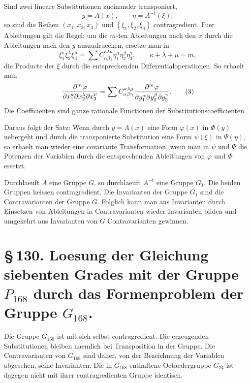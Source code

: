 \documentclass[11pt]{article}
\begin{document}
Sind zwei lineare Substitutionen zueinander transponiert,
\begin{equation}
y=A(x),\qquad \eta=A^{-t}(\xi),
\tag{1}
\end{equation}
so sind die Reihen \((x_1,x_2,x_3)\) und \((\xi_1,\xi_2,\xi_3)\) contragredient. Fuer Ableitungen gilt die Regel: um die \(m\)-ten Ableitungen nach den \(x\) durch die Ableitungen nach den \(y\) auszudruecken, ersetze man in
\begin{equation}
\xi_1^\kappa\xi_2^\lambda\xi_3^\mu
=\sum C^{\kappa\lambda\mu}_{\alpha\beta\gamma}
\eta_1^\alpha\eta_2^\beta\eta_3^\gamma,
\qquad \kappa+\lambda+\mu=m,
\tag{2}
\end{equation}
die Producte der \(\xi\) durch die entsprechenden Differentialoperationen. So erhaelt man
\begin{equation}
{\partial^m \varphi\over\partial x_1^\kappa\partial x_2^\lambda\partial x_3^\mu}
=\sum C^{\kappa\lambda\mu}_{\alpha\beta\gamma}
{\partial^m \varphi\over\partial y_1^\alpha\partial y_2^\beta\partial y_3^\gamma}.
\tag{3}
\end{equation}
Die Coefficienten sind ganze rationale Functionen der Substitutionscoefficienten.

Daraus folgt der Satz: Wenn durch \(y=A(x)\) eine Form \(\varphi(x)\) in \(\Phi(y)\) uebergeht und durch die transponierte Substitution eine Form \(\psi(\xi)\) in \(\Psi(\eta)\), so erhaelt man wieder eine covariante Transformation, wenn man in \(\psi\) und \(\Psi\) die Potenzen der Variablen durch die entsprechenden Ableitungen von \(\varphi\) und \(\Phi\) ersetzt.

Durchlaeuft \(A\) eine Gruppe \(G\), so durchlaeuft \(A^{-t}\) eine Gruppe \(G_1\). Die beiden Gruppen heissen contragredient. Die Invarianten der Gruppe \(G_1\) sind die Contravarianten der Gruppe \(G\). Folglich kann man aus Invarianten durch Einsetzen von Ableitungen in Contravarianten wieder Invarianten bilden und umgekehrt aus Invarianten von \(G\) Contravarianten gewinnen.

\section*{\S\,130. Loesung der Gleichung siebenten Grades mit der Gruppe \(P_{168}\) durch das Formenproblem der Gruppe \(G_{168}\).}

Die Gruppe \(G_{168}\) ist mit sich selbst contragredient. Die erzeugenden Substitutionen bleiben naemlich bei Transposition in der Gruppe. Die Contravarianten von \(G_{168}\) sind daher, von der Bezeichnung der Variablen abgesehen, seine Invarianten. Die in \(G_{168}\) enthaltene Octaedergruppe \(G_{24}\) ist dagegen nicht mit ihrer contragredienten Gruppe identisch.
\end{document}
